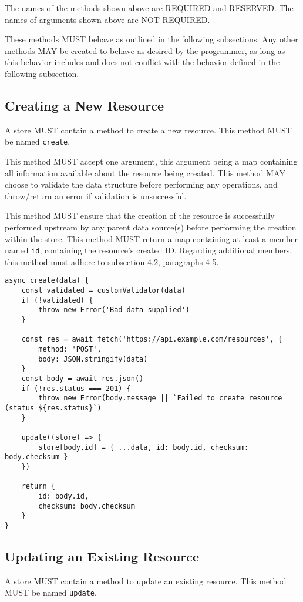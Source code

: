 \documentclass{article}
\begin{document}
The names of the methods shown above are REQUIRED and RESERVED. The names of arguments shown above are NOT REQUIRED.

These methods MUST behave as outlined in the following subsections. Any other methods MAY be created to behave as desired by the programmer, as long as this behavior includes and does not conflict with the behavior defined in the following subsection.

\subsection{Creating a New Resource}
A store MUST contain a method to create a new resource. This method MUST be named \verb|create|.

This method MUST accept one argument, this argument being a map containing all information available about the resource being created. This method MAY choose to validate the data structure before performing any operations, and throw/return an error if validation is unsuccessful.

This method MUST ensure that the creation of the resource is successfully performed upstream by any parent data source(s) before performing the creation within the store. This method MUST return a map containing at least a member named \verb|id|, containing the resource's created ID. Regarding additional members, this method must adhere to subsection 4.2, paragraphs 4-5.

\newpage
\begin{lstlisting}[caption=Create Method]
async create(data) {
    const validated = customValidator(data)
    if (!validated) {
        throw new Error('Bad data supplied')
    }
    
    const res = await fetch('https://api.example.com/resources', {
        method: 'POST',
        body: JSON.stringify(data)
    }
    const body = await res.json()
    if (!res.status === 201) {
        throw new Error(body.message || `Failed to create resource (status ${res.status}`)
    }
    
    update((store) => {
        store[body.id] = { ...data, id: body.id, checksum: body.checksum }
    })
    
    return {
        id: body.id,
        checksum: body.checksum
    }
}
\end{lstlisting}

\subsection{Updating an Existing Resource}
A store MUST contain a method to update an existing resource. This method MUST be named \verb|update|.
\end{document}
